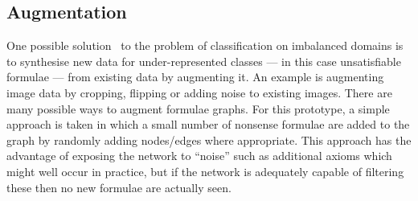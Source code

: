 \documentclass{llncs}
\begin{document}
\subsection{Augmentation}
\label{section:augmentation}
One possible solution~\cite{imbalanced} to the problem of classification on imbalanced domains is to synthesise new data for under-represented classes --- in this case unsatisfiable formulae --- from existing data by augmenting it.
An example is augmenting image data by cropping, flipping or adding noise to existing images.
There are many possible ways to augment formulae graphs.
For this prototype, a simple approach is taken in which a small number of nonsense formulae are added to the graph by randomly adding nodes/edges where appropriate.
This approach has the advantage of exposing the network to ``noise'' such as additional axioms which might well occur in practice, but if the network is adequately capable of filtering these then no new formulae are actually seen.
\end{document}
